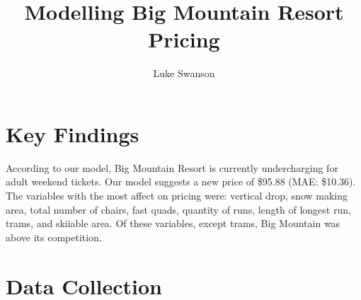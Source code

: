 \documentclass[12pt,letterpaper]{report}
\author{Luke Swanson}
\title{Modelling Big Mountain Resort Pricing}
\begin{document}
\maketitle
\section{Key Findings}
According to our model, Big Mountain Resort is currently undercharging for adult weekend tickets. Our model suggests a new price of \$95.88 (MAE: \$10.36). The variables with the most affect on pricing were: vertical drop, snow making area, total number of chairs, fast quads, quantity of runs, length of longest run, trams, and skiiable area. Of these variables, except trams, Big Mountain was above its competition. 
\section{Data Collection}
 
\end{document}
